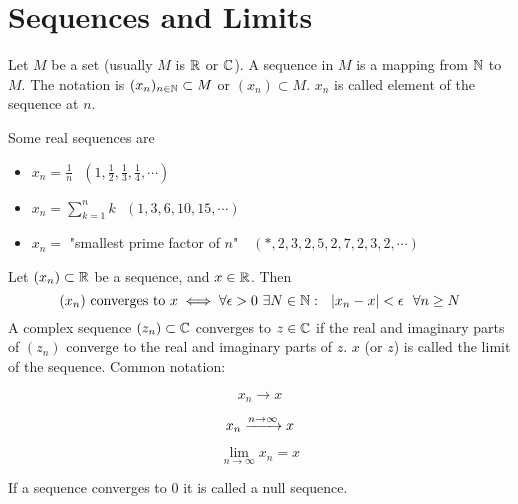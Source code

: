 \documentclass[../../script.tex]{subfiles}
\begin{document}
\section{Sequences and Limits}
\begin{defi}
Let $M$ be a set (usually $M$ is $\mathbb{R}$ or $\mathbb{C}$). A sequence in $M$ is a mapping from $\mathbb{N}$ to $M$. The notation is $(x_n)_{n \in \mathbb{N}} \subset M$ or $(x_n) \subset M$. $x_n$ is called element of the sequence at $n$.
\end{defi}
\newpage
\begin{eg}
Some real sequences are
\begin{itemize}
	\item $x_n = \frac{1}{n} ~~~\left(1, \frac{1}{2}, \frac{1}{3}, \frac{1}{4}, \cdots\right)$
	
	\item $x_n = \sum_{k=1}^n k ~~~\left(1, 3, 6, 10, 15, \cdots\right)$
	
	\item $x_n =$ "smallest prime factor of $n$" $~~~(*, 2, 3, 2, 5, 2, 7, 2, 3, 2, \cdots)$
\end{itemize}
\end{eg}

\begin{defi}[Convergence]
Let $(x_n) \subset \mathbb{R}$ be a sequence, and $x \in \mathbb{R}$. Then
\[
	(x_n) \text{ converges to } x \iff \forall \epsilon > 0 ~\exists N \in \mathbb{N}: ~~|x_n - x| < \epsilon ~~\forall n \ge N
\]
A complex sequence $(z_n) \subset \mathbb{C}$ converges to $z \in \mathbb{C}$ if the real and imaginary parts of $(z_n)$ converge to the real and imaginary parts of $z$. $x$ (or $z$) is called the limit of the sequence. Common notation:

\noindent\begin{minipage}{0.3\textwidth}
\[
	x_n \longrightarrow x
\]
\end{minipage}
\begin{minipage}{0.3\textwidth}
\[
	x_n \convinf x
\]
\end{minipage}
\begin{minipage}{0.3\textwidth}
\[
	\lim_{n \rightarrow \infty} x_n = x
\]
\end{minipage}

\noindent If a sequence converges to $0$ it is called a null sequence.
\end{defi}
\end{document}
